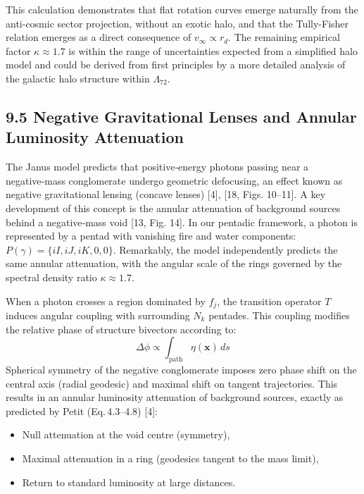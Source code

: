 \documentclass[11pt]{article}
\providecommand{\tightlist}{\setlength{\itemsep}{2pt}\setlength{\parskip}{6pt}}
\providecommand{\tightlist}{%
  \setlength{\itemsep}{2pt}\setlength{\parskip}{6pt}
}
\begin{document}
This calculation demonstrates that flat rotation curves emerge naturally
from the anti-cosmic sector projection, without an exotic halo, and that
the Tully-Fisher relation emerges as a direct consequence of
\(v_\infty \propto r_d\). The remaining empirical factor
\(\kappa \approx 1.7\) is within the range of uncertainties expected
from a simplified halo model and could be derived from first principles
by a more detailed analysis of the galactic halo structure within
\(\Lambda_{72}\).

\hypertarget{negative-gravitational-lenses-and-annular-luminosity-attenuation}{%
\subsection{9.5 Negative Gravitational Lenses and Annular Luminosity
Attenuation}\label{negative-gravitational-lenses-and-annular-luminosity-attenuation}}

The Janus model predicts that positive‑energy photons passing near a
negative‑mass conglomerate undergo geometric defocusing, an effect known
as negative gravitational lensing (concave lenses) {[}4{]}, {[}18, Figs.
10--11{]}. A key development of this concept is the annular attenuation
of background sources behind a negative‑mass void {[}13, Fig. 14{]}. In
our pentadic framework, a photon is represented by a pentad with
vanishing fire and water components:
\(P(\gamma) = \{iI, iJ, iK, 0, 0\}\). Remarkably, the model
independently predicts the same annular attenuation, with the angular
scale of the rings governed by the spectral density ratio
\(\kappa \approx 1.7\).

When a photon crosses a region dominated by \(f_j\), the transition
operator \(T\) induces angular coupling with surrounding \(N_k\)
pentades. This coupling modifies the relative phase of structure
bivectors according to: \[
\Delta \phi \propto \int_{\text{path}} \eta(\mathbf{x}) \, ds
\] Spherical symmetry of the negative conglomerate imposes zero phase
shift on the central axis (radial geodesic) and maximal shift on tangent
trajectories. This results in an annular luminosity attenuation of
background sources, exactly as predicted by Petit (Eq.\,4.3--4.8)
{[}4{]}:

\begin{itemize}
\tightlist
\item
  Null attenuation at the void centre (symmetry),
\item
  Maximal attenuation in a ring (geodesics tangent to the mass limit),
\item
  Return to standard luminosity at large distances.
\end{itemize}
\end{document}
